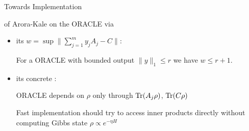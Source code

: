 \begin{frame}{Towards Implementation}
 
  of Arora-Kale  on the ORACLE via
 \begin{itemize}
  \item<2-> its  $w = \sup \| \sum_{j=1}^m y_j A_j - C  \|$:
  
    \vspace{0.25\floatsep}
  
    For a ORACLE with bounded output $\|y\|_1 \leq r$ we have $w \leq r + 1$.
  
  \item<3-> its concrete :
  
   \vspace{0.5\floatsep}
   
   ORACLE depends on $\rho$ only through $\operatorname{Tr}(A_j \rho)$, $\operatorname{Tr}(C\rho)$
   
   \vspace{0.5\floatsep}
   
   Fast implementation should try to access inner products directly without computing Gibbs state $\rho \propto e^{-\eta H}$   
  
 \end{itemize}

\end{frame}
